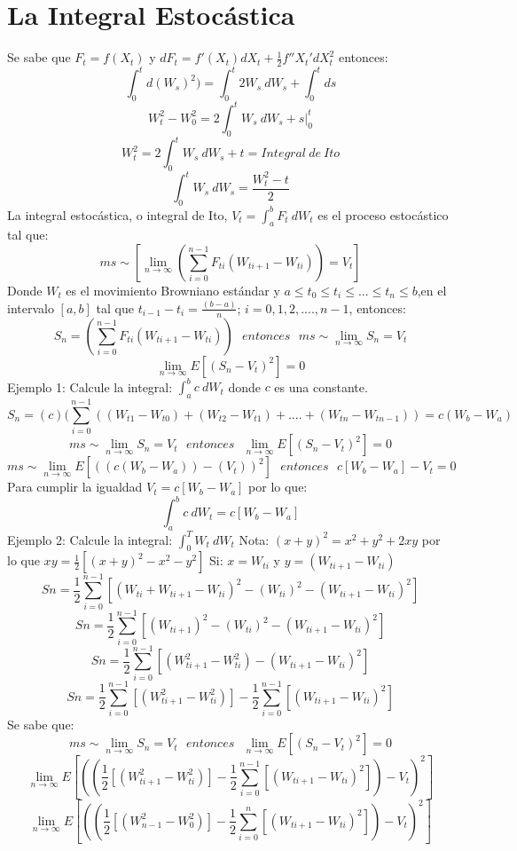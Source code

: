 \documentclass[11pt,fleqn]{book} %
\numberwithin{equation}{section} %
\numberwithin{figure}{section} %
\numberwithin{table}{section} %
\begin{document}
\section{La Integral Estocástica}
Se sabe que $F_{t}=f(X_{t})$ y $ dF_{t}=f'(X_{t})dX_{t}+\frac{1}{2}f''X_{t}'dX_{t}^2$ entonces:
$$\int_{0}^{t} d(W_{s})^2)=\int_{0}^{t} 2W_{s}\:dW_{s}+\int_{0}^{t} ds$$
$$ W_{t}^2 -W_{0}^2 = 2 \int_{0}^{t} W_{s}\:dW_{s} + s \Big|_0^t  $$
$$ W_{t}^2 = 2 \int_{0}^{t} W_{s}\:dW_{s} + t  = {Integral\:de\:Ito} $$
$$ \int_{0}^{t} W_{s}\:dW_{s} = \frac{W_{t}^2 -t}{2}  $$ 
La integral estocástica, o integral de Ito, $V_{t}=\int_{a}^{b} F_{t}\:dW_{t}$ es el proceso estocástico tal que: 
$$ms\sim [\lim_{n \to \infty}(\sum_{i=0}^{n-1}F_{ti}(W_{ti+1}-W_{ti}))= V_{t}]$$
Donde $W_{t}$  es el movimiento Browniano estándar y $a \leq t_{0} \leq t_{i} \leq ...\leq t_{n} \leq b$,en el intervalo $[a,b]$ tal que $t_{i-1} - t_{i} = \frac{(b-a)}{n}$; $i = 0,1,2,....,n-1$, entonces:
$$ S_{n} = (\sum_{i=0}^{n-1}F_{ti}(W_{ti+1}-W_{ti})) \:\:\: entonces \:\:\: ms\sim \lim_{n \to \infty} S_{n} = V_{t}  $$ 
$$ \lim_{n \to \infty} E[(S_{n} - V_{t})^2] = 0$$
Ejemplo 1: Calcule la integral: $\int_{a}^{b} c\:dW_{t}$ donde $c$ es una constante.
$$S_{n} = (c) (\sum_{i=0}^{n-1} ((W_{t1}-W_{t0})+(W_{t2}-W_{t1}) + .... + (W_{tn}-W_{tn-1})) = c(W_{b}-W_{a})$$
$$ms\sim \lim_{n \to \infty} S_{n} = V_{t} \:\:\: entonces \:\:\: \lim_{n \to \infty} E[(S_{n} - V_{t})^2] = 0 $$
$$ ms\sim \lim_{n \to \infty} E[((c(W_{b}-W_{a}))-(V_{t}))^2] \:\:\: entonces \:\:\: c[W_{b}-W_{a}] - V_{t} = 0$$
Para cumplir la igualdad $V_{t} = c[W_{b}-W_{a}]$ por lo que:
$$\int_{a}^{b} c\:dW_{t} = c[W_{b}-W_{a}] $$
Ejemplo 2: Calcule la integral: $\int_{0}^{T} W_{t}\:dW_{t}$
Nota: $(x + y)^2 = x^2 + y^2 + 2xy $ por lo que $ xy = \frac{1}{2}[(x+y)^2 - x^2 - y^2 ]$
Si: $x = W_{ti}$ y $ y = (W_{ti + 1} - W_{ti})$
$$Sn = \frac{1}{2}\sum_{i=0}^{n-1}[(W_{ti} + W_{ti + 1} - W_{ti})^2 - (W_{ti})^2 - (W_{ti + 1} - W_{ti})^2 ]$$
$$Sn = \frac{1}{2}\sum_{i=0}^{n-1}[(W_{ti + 1})^2 - (W_{ti})^2 - (W_{ti + 1} - W_{ti})^2 ]$$
$$Sn = \frac{1}{2}\sum_{i=0}^{n-1}[(W_{ti + 1}^2 - W_{ti}^2) - (W_{ti + 1} - W_{ti})^2 ]$$
$$Sn = \frac{1}{2}\sum_{i=0}^{n-1}[(W_{ti + 1}^2 - W_{ti}^2)] - \frac{1}{2}\sum_{i=0}^{n-1}[(W_{ti + 1} - W_{ti})^2 ]$$
Se sabe que: 
$$ms\sim \lim_{n \to \infty} S_{n} = V_{t} \:\:\: entonces \:\:\: \lim_{n \to \infty} E[(S_{n} - V_{t})^2] = 0 $$
$$\lim_{n \to \infty} E[((\frac{1}{2}[(W_{ti + 1}^2 - W_{ti}^2)] - \frac{1}{2}\sum_{i=0}^{n-1}[(W_{ti + 1} - W_{ti})^2 ]) - V_{t})^2]$$
$$\lim_{n \to \infty} E[((\frac{1}{2}[(W_{n-1}^2 - W_{0}^2)] - \frac{1}{2}\sum_{i=0}^{n}[(W_{ti + 1} - W_{ti})^2 ]) - V_{t})^2]$$
\end{document}
